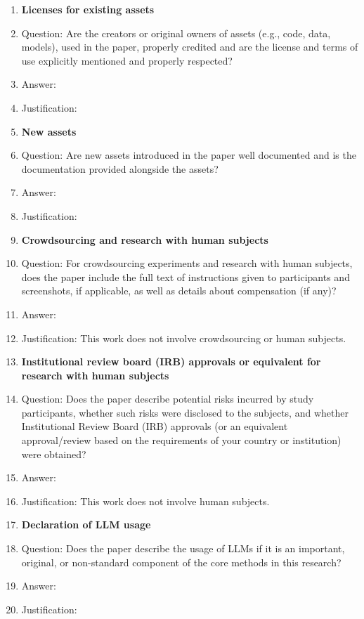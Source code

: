 \begin{enumerate}
\item {\bf Licenses for existing assets}
    \item[] Question: Are the creators or original owners of assets (e.g., code, data, models), used in the paper, properly credited and are the license and terms of use explicitly mentioned and properly respected?
    \item[] Answer: \answerTODO{}
    \item[] Justification: \justificationTODO{}

\item {\bf New assets}
    \item[] Question: Are new assets introduced in the paper well documented and is the documentation provided alongside the assets?
    \item[] Answer: \answerTODO{}
    \item[] Justification: \justificationTODO{}

\item {\bf Crowdsourcing and research with human subjects}
    \item[] Question: For crowdsourcing experiments and research with human subjects, does the paper include the full text of instructions given to participants and screenshots, if applicable, as well as details about compensation (if any)?
    \item[] Answer: \answerNA{}
    \item[] Justification: This work does not involve crowdsourcing or human subjects.

\item {\bf Institutional review board (IRB) approvals or equivalent for research with human subjects}
    \item[] Question: Does the paper describe potential risks incurred by study participants, whether such risks were disclosed to the subjects, and whether Institutional Review Board (IRB) approvals (or an equivalent approval/review based on the requirements of your country or institution) were obtained?
    \item[] Answer: \answerNA{}
    \item[] Justification: This work does not involve human subjects.

\item {\bf Declaration of LLM usage}
    \item[] Question: Does the paper describe the usage of LLMs if it is an important, original, or non-standard component of the core methods in this research?
    \item[] Answer: \answerTODO{}
    \item[] Justification: \justificationTODO{}

\end{enumerate}
